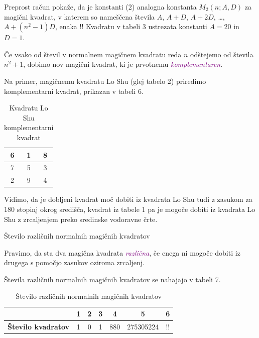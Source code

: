 \documentclass[a4paper,12pt]{article}
\begin{document}
Preprost račun pokaže, da je konstanti (2) analogna konstanta
$M_2(n;A,D)$ za magični kvadrat, v katerem so nameščena števila
$A$, $A+D$, $A+2D$, \dots, $A+(n^2-1)D$, enaka %
!!
Kvadratu v tabeli 3 ustrezata konstanti $A=20$ in $D=1$.

 \begin{definicija}
      Če vsako od števil v normalnem magičnem kvadratu reda $n$ odštejemo
      od števila $n^2+1$, dobimo nov magični kvadrat, ki je prvotnemu
      \textcolor{purple}{\emph{komplementaren}}.
 \end{definicija}

Na primer, magičnemu kvadratu Lo Shu (glej tabelo 2) priredimo
komplementarni kvadrat, prikazan v tabeli 6.
\begin{table}
   \centering
   \caption{Kvadratu Lo Shu komplementarni kvadrat}
   \label{closhu}
   \begin{tabular}{|c|c|c|}   
      \hline   

   6 & 1 & 8 \\\hline
   7 & 5 & 3 \\\hline
   2 & 9 & 4 \\\hline
\end{tabular}
\end{table}

Vidimo, da je dobljeni kvadrat moč dobiti iz kvadrata Lo Shu tudi z zasukom za
180 stopinj okrog središča, kvadrat iz tabele 1 pa je mogoče dobiti
iz kvadrata Lo Shu z zrcaljenjem preko sredinske vodoravne črte.

Število različnih normalnih magičnih kvadratov

 \begin{definicija}
      Pravimo, da sta dva magična kvadrata \textcolor{purple}{\emph{različna}}, če enega ni mogoče dobiti
      iz drugega s pomočjo zasukov oziroma zrcaljenj.
 \end{definicija}

Števila različnih normalnih magičnih kvadratov se nahajajo v tabeli 7.




\begin{table}[h!]
   \centering
   \caption{Število različnih normalnih magičnih kvadratov}
   \label{table:stevila}
   \begin{tabular}{|l|c|c|c|c|c|c|} %
      \hline
      & \textbf{1} & \textbf{2} & \textbf{3} & \textbf{4} & \textbf{5} & \textbf{6} \\ \hline
      \textbf{Število kvadratov} & 1 & 0 & 1 & 880 & 275305224 & !! \\ \hline
   \end{tabular}
\end{table}
\end{document}
